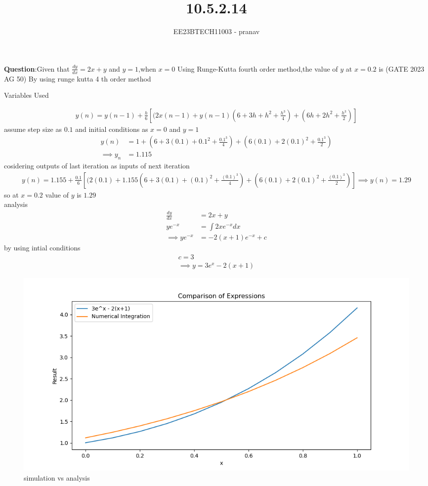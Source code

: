 \documentclass[journal,12pt,twocolumn]{IEEEtran}
\theoremstyle{remark}
\begin{document}

\vspace{3cm}

\title{10.5.2.14}
\author{EE23BTECH11003 - pranav}
\maketitle
\newpage

\bigskip
\renewcommand{\thefigure}{\arabic{figure}}
\renewcommand{\thetable}{\arabic{table}}

\textbf{Question}:Given that $\frac{dy}{dx}=2x+y$ and $y=1$,when $x=0$ Using Runge-Kutta fourth order method,the value of $y$ at $x=0.2$ is \hfill(GATE 2023 AG 50) 
\solution
\fi
By using runge kutta 4 th order method\\
\begin{table}[h]
    \centering
    
    \caption{Variables Used}
\end{table}
\begin{align}
y(n)=y(n-1)+\frac{h}{6}[(2x(n-1)+y(n-1)(6+3h+h^2+\frac{h^3}{4})+(6h+2h^2+\frac{h^3}{2})]
\end{align}
assume step size as $0.1$ and initial conditions as $x=0$ and $y=1$\\
\begin{align}
y(n)&=1+(6+3(0.1)+0.1^2+\frac{0.1^3}{4})+(6(0.1)+2(0.1)^2+\frac{0.1^3}{2})\\
\implies y_{n}&=1.115
\end{align}
cosidering outputs of last iteration as inputs of next iteration\\
\begin{align}
y(n)=1.155+\frac{0.1}{6}[(2(0.1)+1.155(6+3(0.1)+(0.1)^2+\frac{(0.1)^3}{4})+(6(0.1)+2(0.1)^2+\frac{(0.1)^3}{2})]
\implies y(n)=1.29
\end{align}
so at $x=0.2$ value of $y$ is $1.29$\\
analysis
\begin{align}
\frac{dy}{dx}&=2x+y\\
ye^{-x}&=\int2xe^{-x}dx\\
\implies ye^{-x}&=-2(x+1)e^{-x}+c
\end{align}
by using intial conditions
\begin{align}
c=3\\
\implies y=3e^x-2(x+1)
\end{align}
\newpage
\begin{figure}
    \centering
    \includegraphics[width=1\linewidth]{2023/AG/50/figs/grap.png}
    \caption{simulation vs analysis}
\end{figure}

\end{document}
